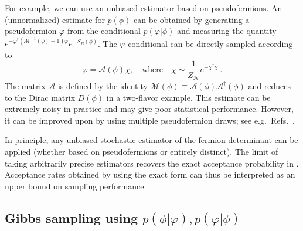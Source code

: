 \documentclass[aps,prd,twocolumn,nofootinbib,superscriptaddress,preprintnumbers]{revtex4-1}
\begin{document}
For example, we can use an unbiased estimator based on pseudofermions. An (unnormalized) estimate for $p(\phi)$ can be obtained by generating a pseudofermion $\varphi$ from the conditional $p(\varphi|\phi)$ and measuring the quantity $e^{-\varphi^\dag (\mathcal{M}^{-1}(\phi) - 1) \varphi} e^{-S_B(\phi)}$. The $\varphi$-conditional can be directly sampled according to
%
\begin{equation}\label{eq:pf-sampling}
    \varphi = \mathcal{A}(\phi) \chi, \quad \mathrm{where} \quad \chi \sim \frac{1}{Z_{\mathcal{N}}}e^{-\chi^\dag \chi}\ .
\end{equation}
%
The matrix $\mathcal{A}$ is defined by the identity ${\mathcal{M}(\phi) \equiv \mathcal{A}(\phi) \mathcal{A}^\dag(\phi)}$ and reduces to the Dirac matrix $D(\phi)$ in a two-flavor example. This estimate can be extremely noisy in practice and may give poor statistical performance. However, it can be improved upon by using multiple pseudofermion draws; see e.g.~Refs.~\cite{hutchinson1990,Hasenbusch:2001xh,Clark:2006fx,deForcrand:2018orx}.

In principle, any unbiased stochastic estimator of the fermion determinant can be applied (whether based on pseudofermions or entirely distinct). The limit of taking arbitrarily precise estimators recovers the exact acceptance probability in . Acceptance rates obtained by using the exact form can thus be interpreted as an upper bound on sampling performance.


\subsection{Gibbs sampling using \texorpdfstring{$p(\phi|\varphi),p(\varphi|\phi)$}{p(phi|varphi), p(varphi|phi)}}
\label{sec:gibbs-sampling}
\end{document}
